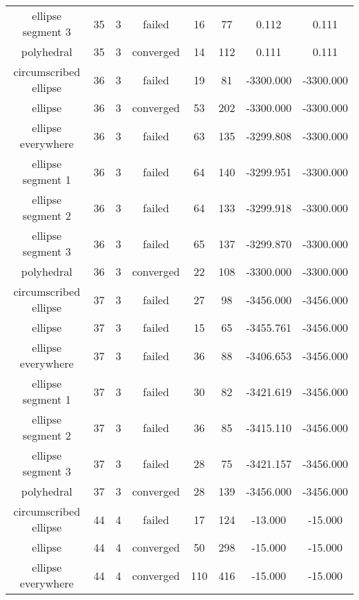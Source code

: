 \begin{footnotesize}
\begin{center}
\begin{longtable}{ c c c c c c c c }
    ellipse segment 3     &   35  &  3  &   failed   &   16  &   77  &   0.112    &   0.111    \\
        polyhedral        &   35  &  3  & converged  &   14  &  112  &   0.111    &   0.111    \\
  circumscribed ellipse   &   36  &  3  &   failed   &   19  &   81  & -3300.000  & -3300.000  \\
         ellipse          &   36  &  3  & converged  &   53  &  202  & -3300.000  & -3300.000  \\
    ellipse everywhere    &   36  &  3  &   failed   &   63  &  135  & -3299.808  & -3300.000  \\
    ellipse segment 1     &   36  &  3  &   failed   &   64  &  140  & -3299.951  & -3300.000  \\
    ellipse segment 2     &   36  &  3  &   failed   &   64  &  133  & -3299.918  & -3300.000  \\
    ellipse segment 3     &   36  &  3  &   failed   &   65  &  137  & -3299.870  & -3300.000  \\
        polyhedral        &   36  &  3  & converged  &   22  &  108  & -3300.000  & -3300.000  \\
  circumscribed ellipse   &   37  &  3  &   failed   &   27  &   98  & -3456.000  & -3456.000  \\
         ellipse          &   37  &  3  &   failed   &   15  &   65  & -3455.761  & -3456.000  \\
    ellipse everywhere    &   37  &  3  &   failed   &   36  &   88  & -3406.653  & -3456.000  \\
    ellipse segment 1     &   37  &  3  &   failed   &   30  &   82  & -3421.619  & -3456.000  \\
    ellipse segment 2     &   37  &  3  &   failed   &   36  &   85  & -3415.110  & -3456.000  \\
    ellipse segment 3     &   37  &  3  &   failed   &   28  &   75  & -3421.157  & -3456.000  \\
        polyhedral        &   37  &  3  & converged  &   28  &  139  & -3456.000  & -3456.000  \\
  circumscribed ellipse   &   44  &  4  &   failed   &   17  &  124  &  -13.000   &  -15.000   \\
         ellipse          &   44  &  4  & converged  &   50  &  298  &  -15.000   &  -15.000   \\
    ellipse everywhere    &   44  &  4  & converged  &  110  &  416  &  -15.000   &  -15.000   \\

\end{longtable}
\end{center}
\end{footnotesize}
